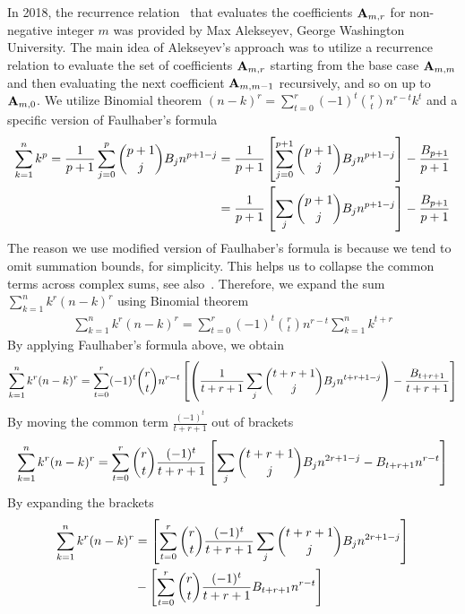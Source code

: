 In 2018, the recurrence relation~\cite{alekseyev2018mathoverflow} that evaluates the coefficients ${\mathbf{A}} \sb{m,r}$ for
non-negative integer $m$ was provided by Max Alekseyev, George Washington University.
The main idea of Alekseyev's approach was to utilize a recurrence relation to evaluate the set of coefficients ${\mathbf{A}} \sb{m,r}$
starting from the base case ${\mathbf{A}} \sb{m,m}$ and then evaluating the next coefficient ${\mathbf{A}} \sb{m,m-1}$
recursively, and so on up to ${\mathbf{A}} \sb{m,0}$.
We utilize Binomial theorem $(n-k)^r=\sum_{t=0}^{r} (-1)^t \binom{r}{t} n^{r-t} k^t$ and a specific version
of Faulhaber's formula~\cite{beardon1996sums}
\begin{align*}
    \sum_{k=1}^{n} k^{p}
    = \frac{1}{p+1}\sum_{j=0}^{p} \binom{p+1}{j} {B}\sb{j} n^{p+1-j}
    &= \frac{1}{p+1} \left[ \sum_{j=0}^{p+1} \binom{p+1}{j} {B}\sb{j} n^{p+1-j} \right] - \frac{{B}\sb{p+1}}{p+1} \\
    &= \frac{1}{p+1} \left[ \sum_{j} \binom{p+1}{j} {B}\sb{j} n^{p+1-j} \right] - \frac{{B}\sb{p+1}}{p+1}
\end{align*}
The reason we use modified version of Faulhaber's formula is because we tend to omit summation bounds, for simplicity.
This helps us to collapse the common terms across complex sums, see also~\cite[~p. 2]{knuth1992two}.
Therefore, we expand the sum $\sum_{k=1}^{n} k^{r} (n-k)^{r}$ using Binomial theorem
\begin{align*}
    \sum_{k=1}^{n} k^{r} (n-k)^{r} = \sum_{t=0}^{r} (-1)^t \binom{r}{t} n^{r-t} \sum_{k=1}^{n} k^{t+r}
\end{align*}
By applying Faulhaber's formula above, we obtain
\begin{align*}
    \sum_{k=1}^{n} k^{r} (n-k)^{r}
    = \sum_{t=0}^{r} (-1)^t \binom{r}{t} n^{r-t} \left[ \left( \frac{1}{t+r+1} \sum_{j} \binom{t+r+1}{j} {B}\sb{j} n^{t+r+1-j} \right) - \frac{{B}\sb{t+r+1}}{t+r+1} \right]
\end{align*}
By moving the common term $\frac{(-1)^t}{t+r+1}$ out of brackets
\begin{align*}
    \sum_{k=1}^{n} k^{r} (n-k)^{r}
    = \sum_{t=0}^{r} \binom{r}{t} \frac{(-1)^t}{t+r+1} \left[ \sum_{j} \binom{t+r+1}{j} {B}\sb{j} n^{2r+1-j} - {B}\sb{t+r+1} n^{r-t} \right]
\end{align*}
By expanding the brackets
\begin{align*}
    \sum_{k=1}^{n} k^{r} (n-k)^{r}
    &= \left[ \sum_{t=0}^{r} \binom{r}{t} \frac{(-1)^t}{t+r+1} \sum_{j} \binom{t+r+1}{j} {B}\sb{j} n^{2r+1-j}  \right] \\
    &- \left[ \sum_{t=0}^{r} \binom{r}{t} \frac{(-1)^t}{t+r+1} {B}\sb{t+r+1} n^{r-t} \right]
\end{align*}
